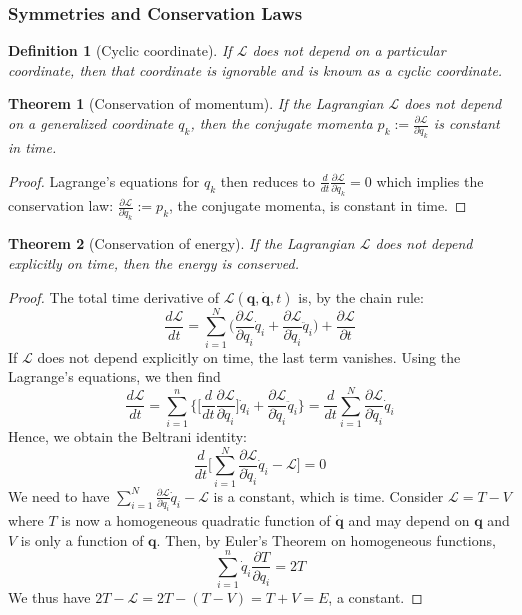 \documentclass[a4paper]{article}
\newtheorem{defi}{Definition}[section]
\newtheorem{thm}{Theorem}[section]
\theoremstyle{new}
\begin{document}
\subsubsection*{Symmetries and Conservation Laws}
\begin{defi}[Cyclic coordinate]
If $\mathcal{L}$ does not depend on a particular coordinate, then that coordinate is ignorable and is known as a cyclic coordinate.
\end{defi}
\begin{thm}[Conservation of momentum]
If the Lagrangian $\mathcal{L}$ does not depend on a generalized coordinate $q_k$, then the conjugate momenta $p_k:=\frac{\partial\mathcal{L}}{\partial\dot{q}_k}$ is constant in time.
\end{thm}
\begin{proof}
Lagrange's equations for $q_k$ then reduces to $\frac{d}{dt}\frac{\partial\mathcal{L}}{\partial\dot{q}_k}=0$ which implies the conservation law: $\frac{\partial\mathcal{L}}{\partial\dot{q}_k}:=p_k$, the conjugate momenta, is constant in time.
\end{proof}
\begin{thm}[Conservation of energy]
If the Lagrangian $\mathcal{L}$ does not depend explicitly on time, then the energy is conserved.
\end{thm}
\begin{proof}
The total time derivative of $\mathcal{L}(\mathbf{q},\mathbf{\dot{q}},t)$ is, by the chain rule:
$$\frac{d\mathcal{L}}{dt}=\sum_{i=1}^N\bigg(\frac{\partial\mathcal{L}}{\partial q_i}\dot{q}_i+\frac{\partial\mathcal{L}}{\partial\dot{q}_i}\ddot{q}_i\bigg)+\frac{\partial\mathcal{L}}{\partial t}$$
If $\mathcal{L}$ does not depend explicitly on time, the last term vanishes. Using the Lagrange's equations, we then find
$$\frac{d\mathcal{L}}{dt}=\sum_{i=1}^n\bigg\{\bigg[\frac{d}{dt}\frac{\partial\mathcal{L}}{\partial\dot{q}_i}\bigg]\dot{q}_i+\frac{\partial\mathcal{L}}{\partial\dot{q}_i}\ddot{q}_i\bigg\}=\frac{d}{dt}\sum_{i=1}^N\frac{\partial\mathcal{L}}{\partial\dot{q}_i}\dot{q}_i$$
Hence, we obtain the Beltrani identity:
$$\frac{d}{dt}\bigg[\sum_{i=1}^N\frac{\partial\mathcal{L}}{\partial\dot{q}_i}\dot{q}_i-\mathcal{L}\bigg]=0$$
We need to have $\sum_{i=1}^N\frac{\partial\mathcal{L}}{\partial\dot{q}_i}\dot{q}_i-\mathcal{L}$ is a constant, which is time. Consider $\mathcal{L}=T-V$ where $T$ is now a homogeneous quadratic function of $\mathbf{\dot{q}}$ and may depend on $\mathbf{q}$ and $V$ is only a function of $\mathbf{q}$. Then, by Euler's Theorem on homogeneous functions,
$$\sum_{i=1}^n\dot{q}_i\frac{\partial T}{\partial q_i}=2T$$
We thus have $2T-\mathcal{L}=2T-(T-V)=T+V=E$, a constant. 
\end{proof}
\end{document}
